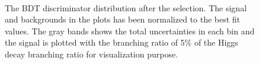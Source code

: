\begin{figure}[htbp] 
     \centering
     \\
     \caption{The BDT discriminator distribution after the selection. The signal and backgrounds in the plots has been normalized to the best fit values. The gray bands shows the total uncertainties in each bin and the signal is plotted with the branching ratio of 5\% of the Higgs decay branching ratio for visualization purpose. }
     \label{fig:bdtbasedpostfit}
\end{figure}



